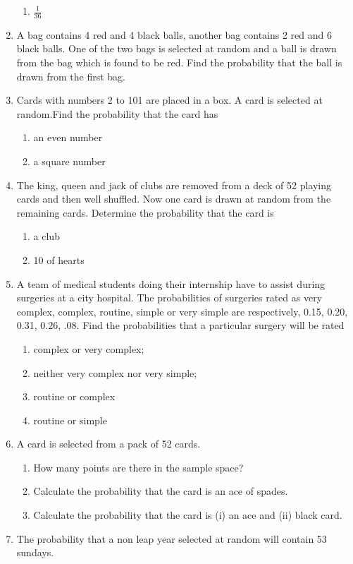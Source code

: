 \begin{enumerate}[label=\thesection.\arabic*,ref=\thesection.\theenumi]
\begin{enumerate}
    \item $\frac{1}{36}$ 
\end{enumerate}
\solution
		
	\item A bag contains 4 red and 4 black balls, another bag contains 2 red and 6 black balls. One of the two bags is selected at random and a ball is drawn from the bag which is found to be red. Find the probability that the ball is drawn from the first bag.
\\
\solution
		
  \item
  Cards with numbers 2 to 101 are placed in a box. A card is selected at random.Find the probability that the card has
\begin{enumerate}[label=(\roman*)]
	\item an even number 
	\item a square number
\end{enumerate}
\solution

\item
The king, queen and jack of clubs are removed from a deck of 52 playing cards and then well shuffled. Now one card is drawn at random from the remaining cards.  Determine the probability that the card is
\begin{enumerate}[label=(\roman*)]
\item a club
\item 10 of hearts
\end{enumerate}
\solution

\item A team of medical students doing their internship have to assist during surgeries
at a city hospital. The probabilities of surgeries rated as very complex, complex,
routine, simple or very simple are respectively, 0.15, 0.20, 0.31, 0.26, .08. Find
the probabilities that a particular surgery will be rated
\begin{enumerate}
	\item complex or very complex;
	\item neither very complex nor very simple;
	\item routine or complex
	\item routine or simple
\end{enumerate}
\solution

\item A card is selected from a pack of 52 cards.
\begin{enumerate}[label=(\alph*)]
    \item How many points are there in the sample space?
    \item Calculate the probability that the card is an ace of spades.
    \item Calculate the probability that the card is (i) an ace and (ii) black card.
\end{enumerate}
\solution

\item The probability that a non leap year selected at random will contain 53 sundays.\\
\solution

\end{enumerate}
